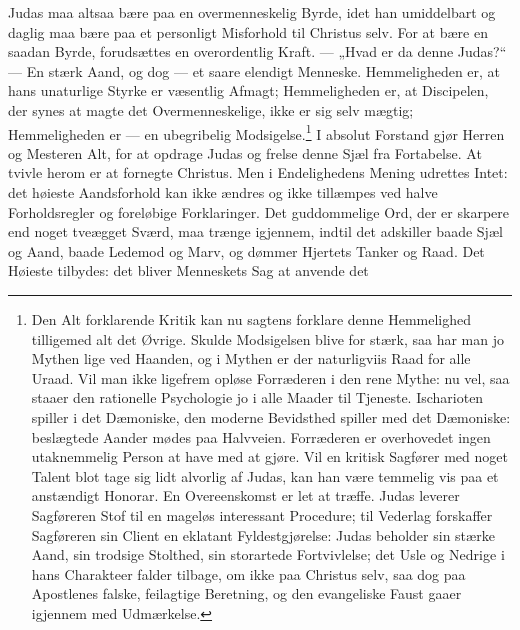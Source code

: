 \documentclass[12pt,a4paper]{book}
\renewcommand{\thefootnote}{*)}
\begin{document}
Judas maa altsaa bære paa en overmenneskelig Byrde, idet han umiddelbart og daglig maa bære
paa et personligt Misforhold til Christus selv. For at bære en saadan Byrde, forudsættes en
overordentlig Kraft. --- „Hvad er da denne Judas?“ --- En stærk Aand, og dog --- et saare
elendigt Menneske. Hemmeligheden er, at hans unaturlige Styrke er væsentlig Afmagt;
Hemmeligheden er, at Discipelen, der synes at magte det Overmenneskelige, ikke er sig selv
mægtig; Hemmeligheden er --- en ubegribelig
Modsigelse.\footnote{Den Alt forklarende Kritik kan nu sagtens forklare denne Hemmelighed
tilligemed alt det Øvrige. Skulde Modsigelsen blive for stærk, saa har man jo Mythen lige ved
Haanden, og i Mythen er der naturligviis Raad for alle Uraad. Vil man ikke ligefrem opløse
Forræderen i den rene Mythe: nu vel, saa staaer den rationelle Psychologie jo i alle Maader
til Tjeneste. Ischarioten spiller i det Dæmoniske, den moderne Bevidsthed spiller med det
Dæmoniske: beslægtede Aander mødes paa Halvveien. Forræderen er overhovedet ingen
utaknemmelig Person at have med at gjøre. Vil en kritisk Sagfører med noget Talent blot tage
sig lidt alvorlig af Judas, kan han være temmelig vis paa et anstændigt Honorar. En
Overeenskomst er let at træffe. Judas leverer Sagføreren Stof til en mageløs interessant
Procedure; til Vederlag forskaffer Sagføreren sin Client en eklatant Fyldestgjørelse: Judas
beholder sin stærke Aand, sin trodsige Stolthed, sin storartede Fortvivlelse; det Usle og
Nedrige i hans Charakteer falder tilbage, om ikke paa Christus selv, saa dog paa Apostlenes
falske, feilagtige Beretning, og den evangeliske Faust gaaer igjennem med Udmærkelse.}
I absolut Forstand gjør Herren og Mesteren Alt, for at opdrage Judas og frelse denne Sjæl fra
Fortabelse. At tvivle herom er at fornegte Christus. Men i Endelighedens Mening udrettes
Intet: det høieste Aandsforhold kan ikke ændres og ikke tillæmpes ved halve Forholdsregler og
foreløbige Forklaringer. Det guddommelige Ord, der er skarpere end noget tveægget Sværd, maa
trænge igjennem, indtil det adskiller baade Sjæl og Aand, baade Ledemod og Marv, og dømmer
Hjertets Tanker og Raad. Det Høieste tilbydes: det bliver Menneskets Sag at anvende det
\end{document}
